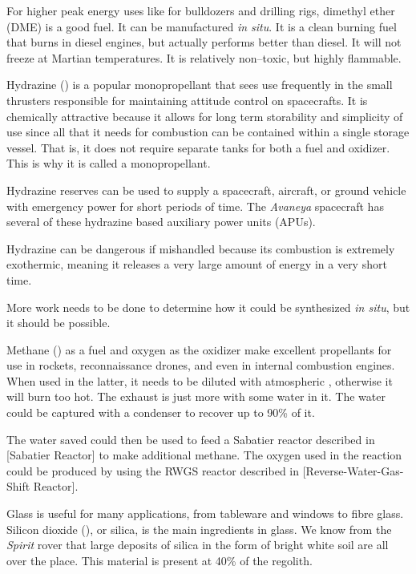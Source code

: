 For higher peak energy uses like for bulldozers and drilling rigs, dimethyl ether  (DME) is a good fuel. It can be manufactured {\it in situ}. It is a clean burning fuel that burns in diesel engines, but actually performs better than diesel. It will not freeze at Martian temperatures. It is relatively non--toxic, but highly flammable.

Hydrazine () is a popular monopropellant that sees use frequently in the small thrusters responsible for maintaining attitude control on spacecrafts. It is chemically attractive because it allows for long term storability and simplicity of use since all that it needs for combustion can be contained within a single storage vessel. That is, it does not require separate tanks for both a fuel and oxidizer. This is why it is called a monopropellant.

Hydrazine reserves can be used to supply a spacecraft, aircraft, or ground vehicle with emergency power for short periods of time. The {\it Avaneya} spacecraft has several of these hydrazine based auxiliary power units (APUs).

Hydrazine can be dangerous if mishandled because its combustion is extremely exothermic, meaning it releases a very large amount of energy in a very short time.

More work needs to be done to determine how it could be synthesized {\it in situ}, but it should be possible.

Methane () as a fuel and oxygen as the oxidizer make excellent propellants for use in rockets, reconnaissance drones, and even in internal combustion engines. When used in the latter, it needs to be diluted with atmospheric , otherwise it will burn too hot. The exhaust is just more  with some water in it. The water could be captured with a condenser to recover up to 90\% of it.

The water saved could then be used to feed a Sabatier reactor described in [Sabatier Reactor] to make additional methane. The oxygen used in the reaction could be produced by using the RWGS reactor described in [Reverse-Water-Gas-Shift Reactor].

Glass is useful for many applications, from tableware and windows to fibre glass. Silicon dioxide (), or silica, is the main ingredients in glass. We know from the {\it Spirit} rover that large deposits of silica in the form of bright white soil are all over the place. This material is present at 40\% of the regolith. 

